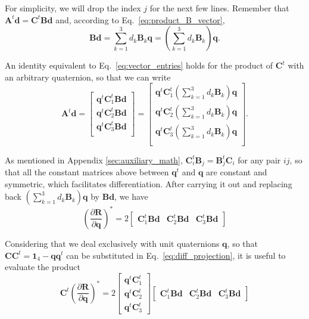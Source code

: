 \documentclass[aip,jcp,reprint,amsmath,amssymb,raggedbottom]{revtex4-1}
\newcommand{\mt}[1]{\boldsymbol{\mathbf{#1}}}           %
\newcommand{\vt}[1]{\boldsymbol{\mathbf{#1}}}           %
\newcommand{\tr}[1]{#1^t}                               %
\newcommand{\diff}[2]{\dfrac{\partial #1}{\partial #2}} %
\begin{document}
For simplicity, we will drop the index $j$ for the next few lines. Remember that $\tr{\mt A}\vt d = \tr{\mt C} \mt B\vt d$ and, according to Eq.~\ref{eq:product_B_vector},
\[
\mt B \vt d = \sum_{k=1}^3 d_k \mt B_k \vt q = \left( \sum_{k=1}^3 d_k \mt B_k \right) \vt q.
\]

An identity equivalent to Eq.~\ref{eq:vector_entries} holds for the product of $\tr{\mt C}$ with an arbitrary quaternion, so that we can write
\[
\tr{\mt A}{\vt d} =
\left[\begin{array}{c}
\tr{\vt q}\tr{\mt C}_1 \mt B \vt d \\
\tr{\vt q}\tr{\mt C}_2 \mt B \vt d \\
\tr{\vt q}\tr{\mt C}_3 \mt B \vt d \\
\end{array}\right] = 
\left[\begin{array}{c}
\tr{\vt q} \tr{\mt C}_1 \left( \sum_{k=1}^3 d_k \mt B_k \right) \vt q \\
\tr{\vt q} \tr{\mt C}_2 \left( \sum_{k=1}^3 d_k \mt B_k \right) \vt q \\
\tr{\vt q} \tr{\mt C}_3 \left( \sum_{k=1}^3 d_k \mt B_k \right) \vt q \\
\end{array}\right].
\]

As mentioned in Appendix \ref{sec:auxiliary_math}, $\tr{\mt C}_i \mt B_j = \tr{\mt B}_j \mt C_i$ for any pair $ij$, so that all the constant matrices above between $\tr{\vt q}$ and $\vt q$ are constant and symmetric, which facilitates differentiation. After carrying it out and replacing back $(\sum_{k=1}^3 d_k \mt B_k) \vt q$ by $\mt B \vt d$, we have
\[
\left( \diff{\vt R}{\vt q} \right)^\ast = 2 \left[\begin{array}{ccc}
\tr{\mt C}_1 \mt B \vt d & \tr{\mt C}_2 \mt B \vt d & \tr{\mt C}_3 \mt B \vt d
\end{array}\right]
\]

Considering that we deal exclusively with unit quaternions $\vt q$, so that $\mt C \tr{\mt C} = \mt 1_4 - \vt q \tr{\vt q}$ can be substituted in Eq.~\ref{eq:diff_projection}, it is useful to evaluate the product
\[
\tr{\mt C} \left( \diff{\vt R}{\vt q} \right)^\ast = 2 \left[\begin{array}{c}
\tr{\vt q}\tr{\mt C_1} \\
\tr{\vt q}\tr{\mt C_2} \\
\tr{\vt q}\tr{\mt C_3}
\end{array}\right] \left[\begin{array}{ccc}
\tr{\mt C}_1 \mt B \vt d & \tr{\mt C}_2 \mt B \vt d & \tr{\mt C}_3 \mt B \vt d
\end{array}\right]
\]
\end{document}
